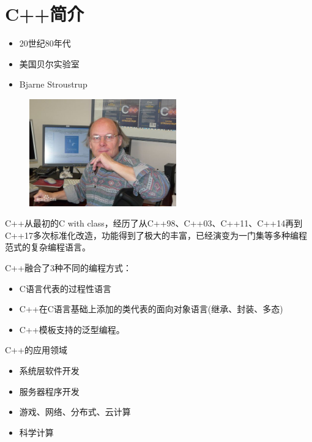 \section{C++简介}

\begin{frame}
  \begin{itemize}
  \item 
     20世纪80年代\\[0.2in]
  \item 
    美国贝尔实验室\\[0.2in]
  \item 
     Bjarne Stroustrup
  \end{itemize}
  \begin{figure}
    \centering
    \includegraphics[width=2.5in]{slide01/images/Stroustrup.jpg}
  \end{figure}
\end{frame}

\begin{frame}
  C++从最初的C with class，经历了从C++98、C++03、C++11、C++14再到C++17多次标准化改造，功能得到了极大的丰富，已经演变为一门集等多种编程范式的复杂编程语言。
\end{frame}


\begin{frame}
  C++融合了3种不同的编程方式：
  \begin{itemize}
  \item C语言代表的过程性语言
  \item C++在C语言基础上添加的类代表的面向对象语言(继承、封装、多态)
  \item C++模板支持的泛型编程。
  \end{itemize}
\end{frame}

\begin{frame}{C++的应用领域}
  \begin{itemize}
  \item 系统层软件开发
   \item 服务器程序开发
   \item 游戏、网络、分布式、云计算
   \item 科学计算
  \end{itemize}
\end{frame}

